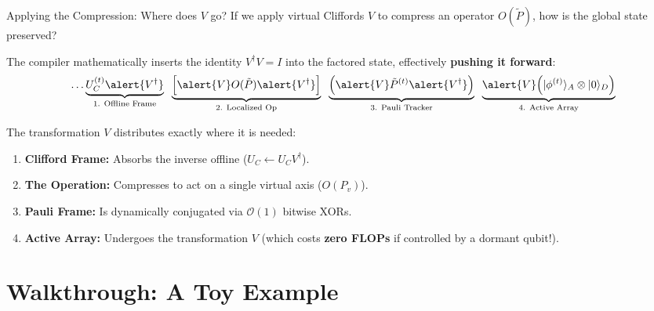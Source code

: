 \documentclass[11pt, aspectratio=169]{beamer}
\begin{document}
\begin{frame}{Applying the Compression: Where does $V$ go?}
  If we apply virtual Cliffords $V$ to compress an operator $O(\tilde{P})$, how is the global state preserved?

  \vspace{0.5em}
  The compiler mathematically inserts the identity $V^\dagger V = I$ into the factored state, effectively \textbf{pushing it forward}:
  \begin{equation*}
      \dots \underbrace{U_C^{(t)} \alert{V^\dagger}}_{\text{1. Offline Frame}} \;\; \underbrace{\Big[ \alert{V} O(\tilde{P}) \alert{V^\dagger} \Big]}_{\text{2. Localized Op}} \;\; \underbrace{\Big( \alert{V} \tilde{P}^{(t)} \alert{V^\dagger} \Big)}_{\text{3. Pauli Tracker}} \;\; \underbrace{\alert{V} \Big( |\phi^{(t)}\rangle_A \otimes |0\rangle_D \Big)}_{\text{4. Active Array}}
  \end{equation*}

  \vspace{0.05em}
  The transformation $V$ distributes exactly where it is needed:
  \begin{enumerate}
      \item \textbf{Clifford Frame:} Absorbs the inverse offline ($U_C \leftarrow U_C V^\dagger$).
      \item \textbf{The Operation:} Compresses to act on a single virtual axis ($O(P_v)$).
      \item \textbf{Pauli Frame:} Is dynamically conjugated via $\mathcal{O}(1)$ bitwise XORs.
      \item \textbf{Active Array:} Undergoes the transformation $V$ (which costs \textbf{zero FLOPs} if controlled by a dormant qubit!).
  \end{enumerate}
\end{frame}

\section{Walkthrough: A Toy Example}
\end{document}

